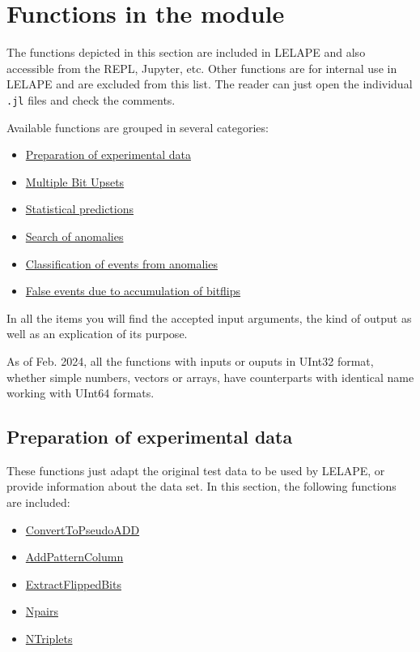  \section{Functions in the module}\label{Sec:FunctionsintheModule}
 The functions depicted in this section are included in LELAPE and also accessible from the REPL, Jupyter, etc. Other functions are for internal use in LELAPE and are excluded from this list. The reader can just open the individual \texttt{.jl} files and check the comments.
 
 Available functions are grouped in several categories:
 
 \begin{itemize}
 	\item \hyperref[SubseC:PreparationExpdata]{Preparation of experimental data}
 	\item \hyperref[SubSeC:MBUs]{Multiple Bit Upsets}
 	\item \hyperref[Subsec:StatisticalPredictions]{Statistical predictions}
 	\item \hyperref[Subsec:SearchOfAnomalies]{Search of anomalies}
 	\item \hyperref [SubSec:ClassificationEventsFromAnomalies]{Classification of events from anomalies}
 	\item \hyperref[SubSec:FalseEvents]{False events due to accumulation of bitflips}
 \end{itemize}
 In all the items you will find the accepted input arguments, the kind of output as well as an explication of its purpose.
 \vspace{2mm}
 \begin{tcolorbox}[title=Note,title filled, colbacktitle=violet]
 	As of Feb. 2024, all the functions with inputs or ouputs in UInt32 format, whether simple numbers, vectors or arrays, have counterparts with identical name working with UInt64 formats.
 \end{tcolorbox}
 \vspace{2mm}
 \subsection{Preparation of experimental data}\label{SubseC:PreparationExpdata}
 These functions just adapt the original test data to be used by LELAPE, or provide information about the data set. In this section, the following functions are included:
 \begin{itemize}
 	\item \hyperref[Func:ConvertToPseudoADD]{ConvertToPseudoADD}
 	\item \hyperref[Func:AddPatternColumn]{AddPatternColumn}
 	\item \hyperref[Func:ExtractFlippedBits]{ExtractFlippedBits}
 	\item \hyperref[Func:Npairs]{Npairs}
 	\item \hyperref[Func:NTriplets]{NTriplets}
 \end{itemize}
